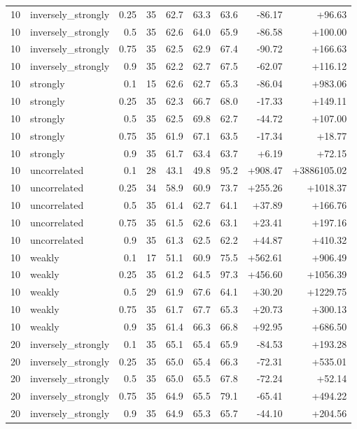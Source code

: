 \begin{tabular}{rlrrrrrrr}
10 & inversely\_strongly & 0.25 & 35 & 62.7 & 63.3 & 63.6 & -86.17 & +96.63 \\
10 & inversely\_strongly & 0.5 & 35 & 62.6 & 64.0 & 65.9 & -86.58 & +100.00 \\
10 & inversely\_strongly & 0.75 & 35 & 62.5 & 62.9 & 67.4 & -90.72 & +166.63 \\
10 & inversely\_strongly & 0.9 & 35 & 62.2 & 62.7 & 67.5 & -62.07 & +116.12 \\
10 & strongly & 0.1 & 15 & 62.6 & 62.7 & 65.3 & -86.04 & +983.06 \\
10 & strongly & 0.25 & 35 & 62.3 & 66.7 & 68.0 & -17.33 & +149.11 \\
10 & strongly & 0.5 & 35 & 62.5 & 69.8 & 62.7 & -44.72 & +107.00 \\
10 & strongly & 0.75 & 35 & 61.9 & 67.1 & 63.5 & -17.34 & +18.77 \\
10 & strongly & 0.9 & 35 & 61.7 & 63.4 & 63.7 & +6.19 & +72.15 \\
10 & uncorrelated & 0.1 & 28 & 43.1 & 49.8 & 95.2 & +908.47 & +3886105.02 \\
10 & uncorrelated & 0.25 & 34 & 58.9 & 60.9 & 73.7 & +255.26 & +1018.37 \\
10 & uncorrelated & 0.5 & 35 & 61.4 & 62.7 & 64.1 & +37.89 & +166.76 \\
10 & uncorrelated & 0.75 & 35 & 61.5 & 62.6 & 63.1 & +23.41 & +197.16 \\
10 & uncorrelated & 0.9 & 35 & 61.3 & 62.5 & 62.2 & +44.87 & +410.32 \\
10 & weakly & 0.1 & 17 & 51.1 & 60.9 & 75.5 & +562.61 & +906.49 \\
10 & weakly & 0.25 & 35 & 61.2 & 64.5 & 97.3 & +456.60 & +1056.39 \\
10 & weakly & 0.5 & 29 & 61.9 & 67.6 & 64.1 & +30.20 & +1229.75 \\
10 & weakly & 0.75 & 35 & 61.7 & 67.7 & 65.3 & +20.73 & +300.13 \\
10 & weakly & 0.9 & 35 & 61.4 & 66.3 & 66.8 & +92.95 & +686.50 \\
20 & inversely\_strongly & 0.1 & 35 & 65.1 & 65.4 & 65.9 & -84.53 & +193.28 \\
20 & inversely\_strongly & 0.25 & 35 & 65.0 & 65.4 & 66.3 & -72.31 & +535.01 \\
20 & inversely\_strongly & 0.5 & 35 & 65.0 & 65.5 & 67.8 & -72.24 & +52.14 \\
20 & inversely\_strongly & 0.75 & 35 & 64.9 & 65.5 & 79.1 & -65.41 & +494.22 \\
20 & inversely\_strongly & 0.9 & 35 & 64.9 & 65.3 & 65.7 & -44.10 & +204.56 \\

\end{tabular}
